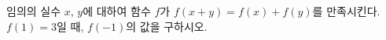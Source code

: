 \hspace*{2mm}\begin{minipage}[t]{\dimexpr\linewidth-2mm\relax}\vspace{0pt}
임의의 실수 $x$, $y$에 대하여 함수 $f$가 $f(x+y)=f(x)+f(y)$를 만족시킨다. $f(1)=3$일 때, $f(-1)$의 값을 구하시오.\end{minipage}
